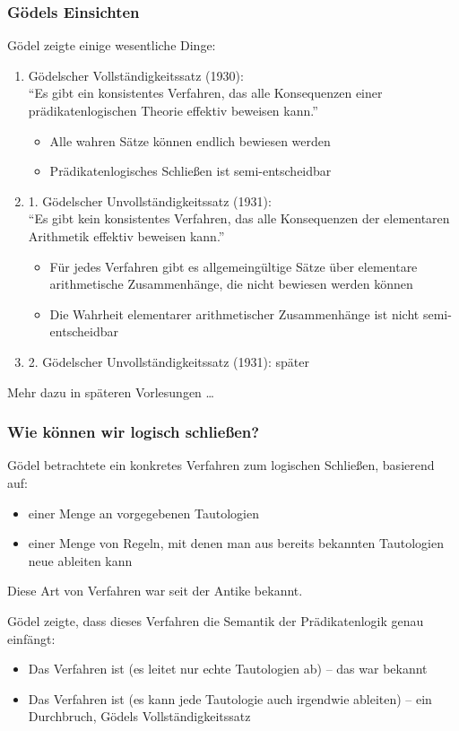 \documentclass[aspectratio=1610,onlymath]{beamer}
\begin{document}
\begin{frame}\frametitle{Gödels Einsichten}

Gödel zeigte einige wesentliche Dinge:
\begin{enumerate}[(1)]
\item \alert{Gödelscher Vollständigkeitssatz (1930):}\\
"`Es gibt ein konsistentes Verfahren, das alle Konsequenzen einer prädikatenlogischen Theorie
effektiv beweisen kann."'
\begin{itemize}
\item Alle wahren Sätze können endlich bewiesen werden
\item Prädikatenlogisches Schließen ist semi-entscheidbar
\end{itemize}\pause
%
\item \alert{1. Gödelscher Unvollständigkeitssatz (1931):} \\
"`Es gibt kein konsistentes Verfahren, das alle Konsequenzen der elementaren Arithmetik
effektiv beweisen kann."'
\begin{itemize}
\item Für jedes Verfahren gibt es allgemeingültige Sätze über elementare arithmetische Zusammenhänge, die nicht bewiesen werden können
\item Die Wahrheit elementarer arithmetischer Zusammenhänge ist nicht semi-entscheidbar
\end{itemize}\pause
\item \alert{2. Gödelscher Unvollständigkeitssatz (1931):} später
\end{enumerate}

Mehr dazu in späteren Vorlesungen \ldots

\end{frame}


\begin{frame}\frametitle{Wie können wir logisch schließen?}

Gödel betrachtete ein konkretes Verfahren zum logischen Schließen,
basierend auf:
\begin{itemize}
\item einer Menge an vorgegebenen Tautologien
\item einer Menge von Regeln, mit denen man aus bereits bekannten Tautologien
neue ableiten kann
\end{itemize}
\alert{Diese Art von Verfahren war seit der Antike bekannt.}
\bigskip\pause

Gödel zeigte, dass dieses Verfahren die Semantik der Prädikatenlogik genau
einfängt:
\begin{itemize}
\item Das Verfahren ist  (es leitet nur echte Tautologien ab) -- das war bekannt
\item Das Verfahren ist  (es kann jede Tautologie auch irgendwie ableiten) -- ein Durchbruch, Gödels Vollständigkeitssatz
\end{itemize}

\end{frame}
\end{document}
